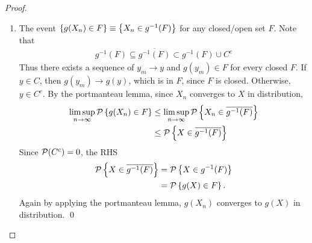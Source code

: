 \documentclass[11pt]{article}
\begin{document}
\begin{itemize}
\begin{proof}
\begin{enumerate}
\item The event $\left\{g(X_{n})\in F\right\} \equiv \left\{X_{n} \in g^{-1}(F)\right\}$ for any closed/open set $F$. Note that
\begin{align*}
g^{-1}(F) \subseteq \overline{g^{-1}(F)} \subset g^{-1}(F)\cup C^{c}
\end{align*}
Thus there exists a sequence of $y_{m}\rightarrow y$ and $g(y_{m})\in F$ for every closed $F$. If $y\in C$, then $g(y_{m})\rightarrow g(y)$, which is in $F$, since $F$ is closed. Otherwise, $y\in C^{c}$. By the portmanteau lemma, since $X_{n}$ converges to $X$ in distribution, 
\begin{align*}
\limsup\limits_{n\rightarrow \infty}{\mathcal P}\left\{g(X_{n}) \in F  \right\} &\le\limsup\limits_{n\rightarrow \infty} {\mathcal P}\left\{X_{n} \in \overline{g^{-1}(F)}  \right\}\\
& \le  {\mathcal P}\left\{X \in \overline{g^{-1}(F)}  \right\}
\end{align*}
Since ${\mathcal P}(C^{c})=0$,  the RHS
\begin{align*}
{\mathcal P}\left\{X \in \overline{g^{-1}(F)}  \right\} &=  {\mathcal P}\left\{ X \in g^{-1}(F)  \right\}\\
&=  {\mathcal P}\left\{g(X) \in F  \right\}.
\end{align*} Again by applying the portmanteau lemma, $g(X_{n})$ converges to $g(X)$ in distribution. \qed
\end{enumerate}
\end{proof}
\end{itemize}
\newpage


\end{document}

